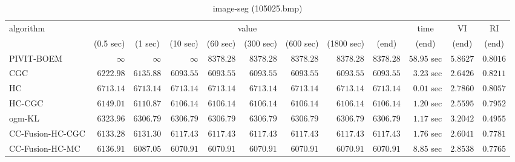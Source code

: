 \begin{table}[H]
\scriptsize
\centering
\caption{image-seg (105025.bmp)}
\label{tab:anytimetable-image-seg-105025.bmp}
\begin{tabular}{lrrrrrrrrrrr}
\toprule
           algorithm &                                   \multicolumn{8}{c}{value} & \multicolumn{1}{c}{time}    & \multicolumn{1}{c}{VI}  & \multicolumn{1}{c}{RI} \\  
\cmidrule(lr){2-9}\cmidrule(lr){10-10} \cmidrule(lr){11-11} \cmidrule(lr){12-12}   
                     & \multicolumn{1}{c}{(0.5 sec)} & \multicolumn{1}{c}{(1 sec)} & \multicolumn{1}{c}{(10 sec)} & \multicolumn{1}{c}{(60 sec)} & \multicolumn{1}{c}{(300 sec)} & \multicolumn{1}{c}{(600 sec)} & \multicolumn{1}{c}{(1800 sec)} & \multicolumn{1}{c}{(end)} & \multicolumn{1}{c}{(end)}    & \multicolumn{1}{c}{(end)}   & \multicolumn{1}{c}{(end)}  \\ \midrule 
          PIVIT-BOEM & $\infty$ & $\infty$ & $\infty$ & $      8378.28$ & $      8378.28$ & $      8378.28$ & $      8378.28$ & $      8378.28$ & $        58.95$ sec    & $       5.8627$  & $       0.8016$ \\ 
                 CGC & $      6222.98$ & $      6135.88$ & $      6093.55$ & $      6093.55$ & $      6093.55$ & $      6093.55$ & $      6093.55$ & $      6093.55$ & $         3.23$ sec    & $       2.6426$  & $       0.8211$ \\ 
                  HC & $      6713.14$ & $      6713.14$ & $      6713.14$ & $      6713.14$ & $      6713.14$ & $      6713.14$ & $      6713.14$ & $      6713.14$ & $         0.01$ sec    & $       2.7860$  & $       0.8057$ \\ 
              HC-CGC & $      6149.01$ & $      6110.87$ & $      6106.14$ & $      6106.14$ & $      6106.14$ & $      6106.14$ & $      6106.14$ & $      6106.14$ & $         1.20$ sec    & $       2.5595$  & $       0.7952$ \\ 
              ogm-KL & $      6323.96$ & $      6306.79$ & $      6306.79$ & $      6306.79$ & $      6306.79$ & $      6306.79$ & $      6306.79$ & $      6306.79$ & $         1.17$ sec    & $       3.2042$  & $       0.4955$ \\ 
    CC-Fusion-HC-CGC & $      6133.28$ & $      6131.30$ & $      6117.43$ & $      6117.43$ & $      6117.43$ & $      6117.43$ & $      6117.43$ & $      6117.43$ & $         1.76$ sec    & $       2.6041$  & $       0.7781$ \\ 
     CC-Fusion-HC-MC & $      6136.91$ & $      6087.05$ & $      6070.91$ & $      6070.91$ & $      6070.91$ & $      6070.91$ & $      6070.91$ & $      6070.91$ & $         8.85$ sec    & $       2.8538$  & $       0.7765$ \\ 

\end{tabular}
\end{table}

